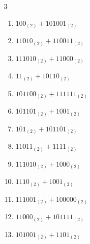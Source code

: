 \begin{multicols}{3}
\begin{enumerate}

  \item $100_{(2)} + 101001_{(2)}$


  \item $11010_{(2)} + 110011_{(2)}$


\columnbreak %

\resetques

  \item $111010_{(2)} + 11000_{(2)}$


  \item $11_{(2)} + 10110_{(2)}$


  \item $101100_{(2)} + 111111_{(2)}$


  \item $101101_{(2)} + 1001_{(2)}$


  \item $101_{(2)} + 101101_{(2)}$


  \item $11011_{(2)} + 1111_{(2)}$


  \item $111010_{(2)} + 1000_{(2)}$


  \item $1110_{(2)} + 1001_{(2)}$


  \item $111001_{(2)} + 100000_{(2)}$


  \item $11000_{(2)} + 101111_{(2)}$


\columnbreak %

  \item $101001_{(2)} + 1101_{(2)}$


\end{enumerate}
\end{multicols}
